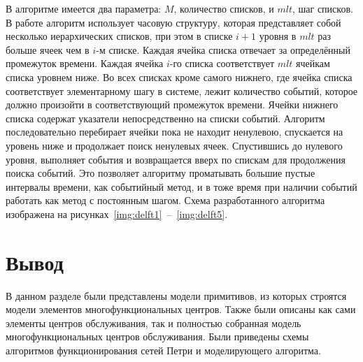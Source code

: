 В алгоритме имеется два параметра: $M$, количество списков, и $mlt$, шаг списков. В работе алгоритм использует часовую структуру, которая представляет собой несколько иерархических списков, при этом в списке  $i + 1$ уровня в $mlt$ раз больше ячеек чем в $i$-м списке. Каждая ячейка списка отвечает за определённый промежуток времени. Каждая ячейка $i$-го списка соответствует $mlt$ ячейкам списка уровнем ниже. Во всех списках кроме самого нижнего, где ячейка списка соответствует элементарному шагу в системе, лежит количество событий, которое должно произойти в соответствующий промежуток времени. Ячейки нижнего списка содержат указатели непосредственно на списки событий. Алгоритм последовательно перебирает ячейки пока не находит ненулевою, спускается на уровень ниже и продолжает поиск ненулевых ячеек. Спустившись до нулевого уровня, выполняет события и возвращается вверх по спискам для продолжения поиска событий. Это позволяет алгоритму проматывать большие пустые интервалы времени, как событийный метод, и в тоже время при наличии событий работать как метод с постоянным шагом. Схема разработанного алгоритма изображена на рисунках~\ref{img:delft1}~--~\ref{img:delft5}.

\FloatBarrier

\FloatBarrier

\FloatBarrier

\FloatBarrier

\FloatBarrier

\section*{Вывод}

В данном разделе были представлены модели примитивов, из которых строятся модели элементов многофункциональных центров. Также были описаны как сами элементы центров обслуживания, так и полностью собранная модель  многофункциональных центров обслуживания. Были приведены схемы алгоритмов функционирования сетей Петри и моделирующего алгоритма. 